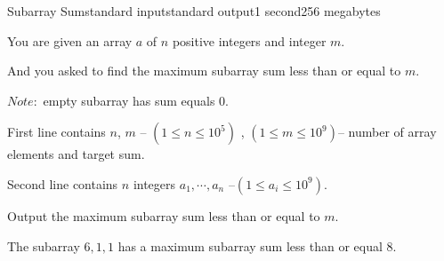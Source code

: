 \begin{problem}{Subarray Sum}{standard input}{standard output}{1 second}{256 megabytes}

You are given an array $a$ of $n$ positive integers and integer $m$.

And you asked to find the maximum subarray sum less than or equal to $m$.

$Note: $ empty subarray has sum equals $0$.

\InputFile
First line contains $n$, $m$ -- $(1\le n\le 10^5)$ , $(1\le m\le 10^9)$-- number of array elements and target sum.

Second line contains $n$ integers $a_1,\cdots,a_n$ --$(1 \le a_i \le 10^9)$.

\OutputFile
Output the maximum subarray sum less than or equal to $m$.

\Example

\begin{example}
%
\end{example}

\Note
The subarray {$6, 1, 1$} has a maximum subarray sum less than or equal $8$.

\end{problem}

